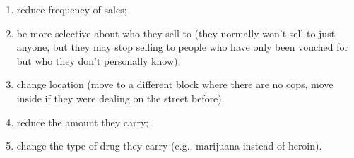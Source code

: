 \documentclass[runningheads,a4paper]{llncs}
\begin{document}
\begin{enumerate}
   \item reduce frequency of sales;
   \item  be more selective about who they sell to (they normally won't sell to just anyone, but they may stop selling to people who have only been vouched for but who they don't personally know);
   \item change location (move to a different block where there are no cops, move inside if they were dealing on the street before).
   \item reduce the amount they carry;
  \item change the type of drug they carry (e.g., marijuana instead of heroin).
\end{enumerate}








\end{document}
